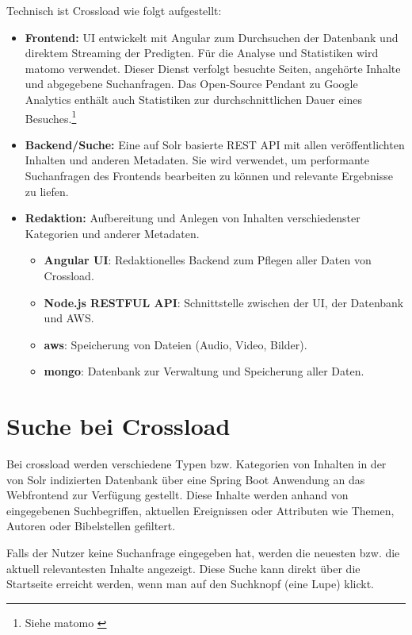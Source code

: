 Technisch ist Crossload wie folgt aufgestellt:
\begin{itemize}
  \item \textbf{Frontend:} UI entwickelt mit Angular zum Durchsuchen der Datenbank und direktem Streaming der Predigten. Für die Analyse und Statistiken wird \gls{matomo} verwendet. Dieser Dienst verfolgt besuchte Seiten, angehörte Inhalte und abgegebene Suchanfragen. Das Open-Source Pendant zu Google Analytics enthält auch Statistiken zur durchschnittlichen Dauer eines Besuches.\footnote{Siehe \gls{matomo} \cite{matomo2022}}
  \item \textbf{Backend/Suche:} Eine auf Solr basierte REST API mit allen veröffentlichten Inhalten und anderen Metadaten. Sie wird verwendet, um performante Suchanfragen des Frontends bearbeiten zu können und relevante Ergebnisse zu liefen.
  \item \textbf{Redaktion:} Aufbereitung und Anlegen von Inhalten verschiedenster Kategorien und anderer Metadaten.
  \begin{itemize}
    \item \textbf{Angular UI}: Redaktionelles Backend zum Pflegen aller Daten von Crossload.
    \item \textbf{Node.js RESTFUL API}: Schnittstelle zwischen der UI, der Datenbank und AWS.
    \item \textbf{\gls{aws}}: Speicherung von Dateien (Audio, Video, Bilder).
    \item \textbf{\gls{mongo}}: Datenbank zur Verwaltung und Speicherung aller Daten.
  \end{itemize}
\end{itemize}

\section{Suche bei Crossload}
\label{sec:implementedFunctionality}

Bei \gls{crossload} werden verschiedene Typen bzw. Kategorien von Inhalten in der von Solr indizierten Datenbank über eine Spring Boot Anwendung an das Webfrontend zur Verfügung gestellt.
Diese Inhalte werden anhand von eingegebenen Suchbegriffen, aktuellen Ereignissen oder Attributen wie Themen, Autoren oder Bibelstellen gefiltert.

Falls der Nutzer keine Suchanfrage eingegeben hat, werden die neuesten bzw. die aktuell relevantesten Inhalte angezeigt.
Diese Suche kann direkt über die Startseite erreicht werden, wenn man auf den Suchknopf (eine Lupe) klickt.

